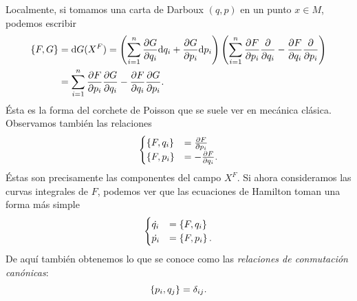 Localmente, si tomamos una carta de Darboux $(q,p)$ en un punto $x\in M$, podemos escribir
  \begin{align*}
    \left\lbrace F,G\right\rbrace & = \mathrm{d} G (X^F) = \left( \sum_{i=1}^n \frac{\partial G}{\partial q_i} \mathrm{d} q_i + \frac{\partial G}{\partial p_i} \mathrm{d} p_i \right) \left( \sum_{i=1}^n \frac{\partial F}{\partial p_i} \frac{\partial}{\partial q_i} - \frac{\partial F}{\partial q_i} \frac{\partial}{\partial p_i}\right) \\ 
    & =\sum_{i=1}^n \frac{\partial F}{\partial p_i} \frac{\partial G}{\partial q_i} - \frac{\partial F}{\partial q_i} \frac{\partial G}{\partial p_i}.
  \end{align*}
  Ésta es la forma del corchete de Poisson que se suele ver en mecánica clásica. Observamos también las relaciones
  \begin{equation*}
    \begin{cases}
    \left\lbrace F,q_i\right\rbrace &= \frac{\partial F}{\partial p_i} \\
    \left\lbrace F,p_i\right\rbrace &= -\frac{\partial F}{\partial q_i}.
  \end{cases}
  \end{equation*}
Éstas son precisamente las componentes del campo $X^F$. Si ahora consideramos las curvas integrales de $F$, podemos ver que las ecuaciones de Hamilton toman una forma más simple
  \begin{equation*}
    \begin{cases}
      \dot{q_i} &= \left\lbrace F,q_i\right\rbrace \\
      \dot{p_i} &= \left\lbrace F,p_i\right\rbrace.
  \end{cases}
  \end{equation*}
  De aquí también obtenemos lo que se conoce como las \emph{relaciones de conmutación canónicas}:
  \begin{equation*}
    \left\lbrace p_i,q_j\right\rbrace=\delta_{ij}.
  \end{equation*}

